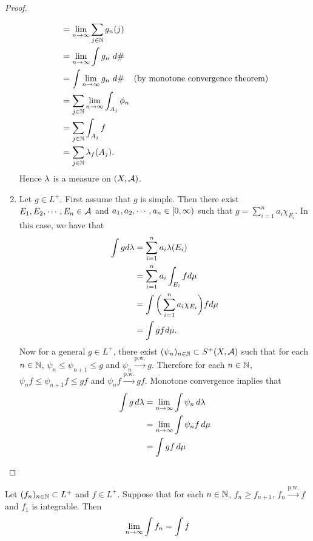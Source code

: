 \documentclass{book}
\begin{document}
\begin{proof}
\begin{enumerate}
\begin{align*}
				& = \lim \limits_{n \rightarrow \infty} \sum_{j \in \mathbb{N}} g_n(j) \\
				& = \lim \limits_{n \rightarrow \infty} \int g_n \, \, d \# \\
				& = \int \lim \limits_{n \rightarrow \infty} g_n \, \, d \# \hspace{4mm} \text{(by monotone convergence theorem)} \\ 
				& = \sum_{j \in \mathbb{N}} \lim \limits_{n \rightarrow \infty} \int_{A_j} \phi_n \hspace{4mm} \\
				& = \sum_{j \in \mathbb{N}} \int_{A_j} f \\
				& = \sum_{j \in \mathbb{N}} \lambda_f(A_j).
			\end{align*} 
			Hence $\lambda$ is a measure on $(X, \mathcal{A})$. 
			\item Let $g \in L^+$. First assume that $g$ is simple. Then there exist $E_1, E_2, \cdots, E_n \in \mathcal{A}$ and  $a_1, a_2, \cdots, a_n \in [0,\infty)$ such that $g = \sum\limits_{i=1}^n a_i \chi_{E_i}$.
			In this case, we have that 
			\begin{align*}
				\int g d\lambda 
				&= \sum_{i=1}^n a_i \lambda(E_i)\\
				&= \sum_{i=1}^n a_i \int_{E_i} f d\mu\\
				&= \int \bigg(\sum_{i=1}^n a_i\chi_{E_i} \bigg) f d\mu\\
				&= \int gf d\mu.
			\end{align*}
			Now for a general $g \in L^+$, there exist $(\psi_n)_{n \in \mathbb{N}} \subset S^+(X, \mathcal{A})$ such that for each $n \in \mathbb{N}$, $\psi_n \leq \psi_{n+1} \leq g$ and $\psi_n \xrightarrow{\text{p.w.}} g$. Therefore for each $n \in \mathbb{N}$, $\psi_n f \leq \psi_{n+1}f \leq gf$ and $\psi_nf \xrightarrow{\text{p.w.}} gf$. Monotone convergence implies that
			\begin{align*}
				\int g \, d \lambda 
				&= \lim \limits_{n \rightarrow \infty} \int \psi_n \, d \lambda\\
				&= \lim \limits_{n \rightarrow \infty} \int \psi_n f \, d \mu \\
				&= \int g f \, d \mu 
			\end{align*}
		\end{enumerate}
	\end{proof}
	
	\begin{ex} 
		Let $(f_n)_{n \in \mathbb{N}} \subset L^+$ and $f \in L^+$. Suppose that for each $n \in \mathbb{N}$, $f_n \geq f_{n+1}$, $f_n \xrightarrow{\text{p.w.}} f$ and $f_1$ is integrable. Then 
		$$\lim \limits_{n \rightarrow \infty} \int f_n = \int f$$
	\end{ex}
	
\end{document}
